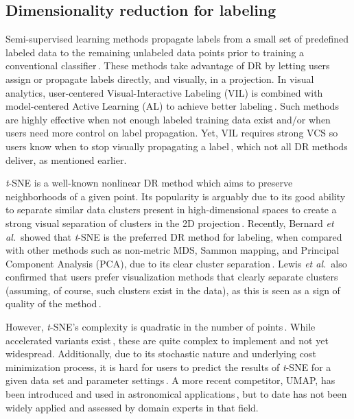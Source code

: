 \documentclass[sagev,Afour,times]{sagej}
\begin{document}
\subsection{Dimensionality reduction for labeling} \label{sec:relatedwork:DRforLabeling}
%
Semi-supervised learning methods propagate labels from a small set of predefined labeled data to the remaining unlabeled data points prior to training a conventional classifier\,\cite{label_propagation_wang2007, semisupervised_clustering_userfeedback2003, barbara2018,benato21}. These methods take advantage of DR by letting users assign or propagate labels directly, and visually, in a projection. In visual analytics, user-centered Visual-Interactive Labeling (VIL) is combined with model-centered Active Learning (AL) to achieve better labeling\,\cite{labeling_wt_DR2017}. Such methods are highly effective when not enough labeled training data exist and/or when users need more control on label propagation. Yet, VIL requires strong VCS so users know when to stop visually propagating a label\,\cite{barbara2018,benato21}, which not all DR methods deliver, as mentioned earlier.

\emph{t}-SNE is a well-known nonlinear DR method which aims to preserve neighborhoods of a given point. Its popularity is arguably due to its good ability to separate similar data clusters present in high-dimensional spaces to create a strong visual separation of clusters in the 2D projection\,\cite{tsne:original}. Recently, Bernard \emph{et al.}\ showed that \emph{t}-SNE is the preferred DR method for labeling, when compared with other methods such as non-metric MDS, Sammon mapping, and Principal Component Analysis (PCA), due to its clear cluster separation\,\cite{labeling_wt_DR2017}. Lewis \emph{et al.}\ also confirmed that users prefer visualization methods that clearly separate clusters (assuming, of course, such clusters exist in the data), as this is seen as a sign of quality of the method\,\cite{dr:lewis2012behavioral,labeling_wt_DR2017}.

However, \emph{t}-SNE's complexity is quadratic in the number of points\,\cite{acctsne}. While accelerated variants exist\,\cite{a_sne,h_sne,gpu_tsne}, these are quite complex to implement and not yet widespread. Additionally, due to its stochastic nature and underlying cost minimization process, it is hard for users to predict the results of \emph{t}-SNE for a given data set and parameter settings\,\cite{tsne:wattenberg}. A more recent competitor, UMAP, has been introduced and used in astronomical applications\,\cite{umap2018, umap:astro}, but to date has not been widely applied and assessed by domain experts in that field.
\end{document}
